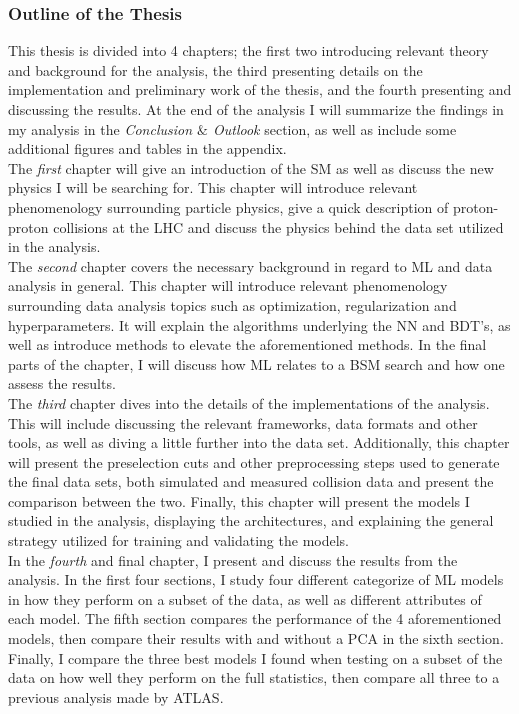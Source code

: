 \subsubsection*{Outline of the Thesis}
This thesis is divided into 4 chapters; the first two introducing relevant theory and background for the analysis, the third presenting 
details on the implementation and preliminary work of the thesis, and the fourth presenting and discussing the results. At the end of the analysis I will summarize 
the findings in my analysis in the \emph{Conclusion $\&$ Outlook} section, as well as include some additional figures and tables 
in the appendix. 
\\
The \emph{first} chapter will give an introduction of the \ac{SM} as well as discuss the new physics I will be searching for. This chapter will 
introduce relevant phenomenology surrounding particle physics, give a quick description of proton-proton collisions at the \ac{LHC} and discuss 
the physics behind the data set utilized in the analysis. 
\\
The \emph{second} chapter covers the necessary background in regard to \ac{ML} and data analysis in general. This chapter will introduce relevant phenomenology
surrounding data analysis topics such as optimization, regularization and hyperparameters. It will explain the algorithms underlying the \ac{NN} and 
\ac{BDT}'s, as well as introduce methods to elevate the aforementioned methods. In the final parts of the chapter, I will discuss how \ac{ML} relates to 
a \ac{BSM} search and how one assess the results.
\\
The \emph{third} chapter dives into the details of the implementations of the analysis. This will include discussing the relevant frameworks, data formats and 
other tools, as well as diving a little further into the data set. Additionally, this chapter will present the preselection cuts and other preprocessing steps
used to generate the final data sets, both simulated and measured collision data and present the comparison between the two. Finally, this chapter will present the 
models I studied in the analysis, displaying the architectures, and explaining the general strategy utilized for training and validating the models.
\\
In the \emph{fourth} and final chapter, I present and discuss the results from the analysis. In the first four sections, I study four different categorize of \ac{ML} models in how they 
perform on a subset of the data, as well as different attributes of each model. The fifth section compares the performance of the 4 aforementioned models, then compare 
their results with and without a \acs{PCA} in the sixth section. Finally, I compare the three best models I found when testing on a subset of the data on how well they perform 
on the full statistics, then compare all three to a previous analysis made by \acs{ATLAS}.



